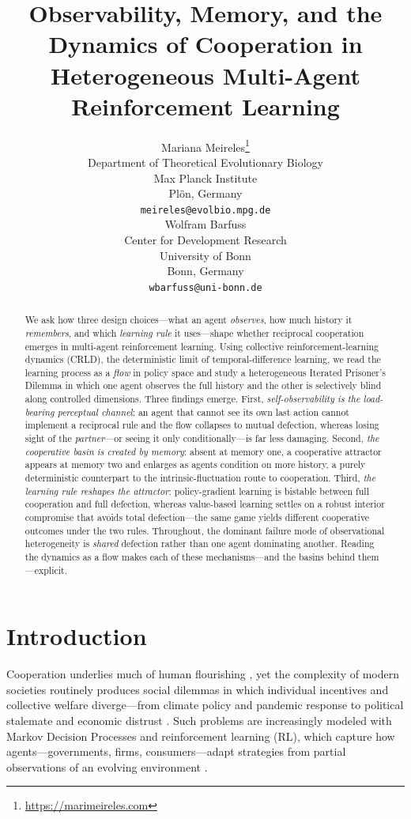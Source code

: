 \documentclass{article}
\title{Observability, Memory, and the Dynamics of Cooperation in\\ Heterogeneous Multi-Agent Reinforcement Learning}
\author{%
  Mariana Meireles\thanks{\href{https://marimeireles.com}{https://marimeireles.com}}\\
  Department of Theoretical Evolutionary Biology\\
  Max Planck Institute\\
  Pl\"on, Germany \\
  \texttt{meireles@evolbio.mpg.de} \\
  \And
  Wolfram Barfuss \\
  Center for Development Research \\
  University of Bonn \\
  Bonn, Germany \\
  \texttt{wbarfuss@uni-bonn.de} \\
}
\begin{document}
\maketitle

\begin{abstract}
We ask how three design choices---what an agent \emph{observes}, how much history it \emph{remembers}, and which \emph{learning rule} it uses---shape whether reciprocal cooperation emerges in multi-agent reinforcement learning. Using collective reinforcement-learning dynamics (CRLD), the deterministic limit of temporal-difference learning, we read the learning process as a \emph{flow} in policy space and study a heterogeneous Iterated Prisoner's Dilemma in which one agent observes the full history and the other is selectively blind along controlled dimensions. Three findings emerge. First, \emph{self-observability is the load-bearing perceptual channel}: an agent that cannot see its own last action cannot implement a reciprocal rule and the flow collapses to mutual defection, whereas losing sight of the \emph{partner}---or seeing it only conditionally---is far less damaging. Second, \emph{the cooperative basin is created by memory}: absent at memory one, a cooperative attractor appears at memory two and enlarges as agents condition on more history, a purely deterministic counterpart to the intrinsic-fluctuation route to cooperation. Third, \emph{the learning rule reshapes the attractor}: policy-gradient learning is bistable between full cooperation and full defection, whereas value-based learning settles on a robust interior compromise that avoids total defection---the same game yields different cooperative outcomes under the two rules. Throughout, the dominant failure mode of observational heterogeneity is \emph{shared} defection rather than one agent dominating another. Reading the dynamics as a flow makes each of these mechanisms---and the basins behind them---explicit.
\end{abstract}

\section{Introduction}

Cooperation underlies much of human flourishing \cite{1, 2}, yet the complexity of modern societies routinely produces social dilemmas in which individual incentives and collective welfare diverge---from climate policy \cite{5} and pandemic response \cite{6} to political stalemate \cite{12, 7} and economic distrust \cite{3}. Such problems are increasingly modeled with Markov Decision Processes and reinforcement learning (RL), which capture how agents---governments, firms, consumers---adapt strategies from partial observations of an evolving environment \cite{6, 4}.
\end{document}
